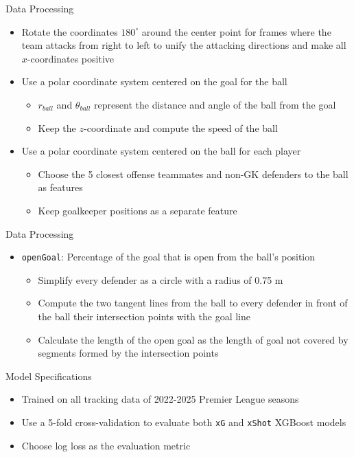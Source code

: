 \documentclass{beamer}
\begin{document}
\begin{frame}{Data Processing}
\begin{itemize}
\item Rotate the coordinates $180^{\circ}$ around the center point for frames where the team attacks from right to left to unify the attacking directions and make all $x$-coordinates positive
\item Use a polar coordinate system centered on the goal for the ball
  \begin{itemize}
  \item $r_{ball}$ and $\theta_{ball}$ represent the distance and angle of the ball from the goal
  \item Keep the $z$-coordinate and compute the speed of the ball
  \end{itemize}
\item Use a polar coordinate system centered on the ball for each player
  \begin{itemize}
  \item Choose the 5 closest offense teammates and non-GK defenders to the ball as features
  \item Keep goalkeeper positions as a separate feature
  \end{itemize}
\end{itemize}
\end{frame}

\begin{frame}{Data Processing}
\begin{itemize}
\item \texttt{openGoal}: Percentage of the goal that is open from the ball's position
  \begin{itemize}
  \item Simplify every defender as a circle with a radius of 0.75 m
  \item Compute the two tangent lines from the ball to every defender in front of the ball their intersection points with the goal line
  \item Calculate the length of the open goal as the length of goal not covered by segments formed by the intersection points
  \end{itemize}
\end{itemize}
\end{frame}

\begin{frame}{Model Specifications}
\begin{itemize}
\item Trained on all tracking data of 2022-2025 Premier League seasons
\item Use a 5-fold cross-validation to evaluate both \texttt{xG} and \texttt{xShot} XGBoost models
\item Choose log loss as the evaluation metric
\end{itemize}
\end{frame}
\end{document}
